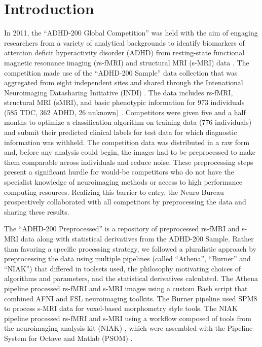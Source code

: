 \documentclass[preprint,12pt,3p]{elsarticle}
\begin{document}
\section{Introduction}

In 2011, the ``ADHD-200 Global Competition'' was held with the aim of engaging researchers from a variety of analytical backgrounds to identify biomarkers of attention deficit hyperactivity disorder (ADHD) from resting-state functional magnetic resonance imaging (rs-fMRI) and structural MRI (s-MRI) data \cite{Milham2012}. The competition made use of the ``ADHD-200 Sample'' data collection that was aggregated from eight independent sites and shared through the Intenational Neuroimaging Datasharing Initiative (INDI) \cite{Mennes2013}. The data includes rs-fMRI, structural MRI (sMRI), and basic phenotypic information for 973 individuals (585 TDC, 362 ADHD, 26 unknown) \cite{Milham2012}. Competitors were given five and a half months to optimize a classification algorithm on training data (776 individuals) and submit their predicted clinical labels for test data for which diagnostic information was withheld. The competition data was distributed in a raw form and, before any analysis could begin, the images had to be preprocessed to make them comparable across individuals and reduce noise. These preprocessing steps present a significant hurdle for would-be competitors who do not have the specialist knowledge of neuroimaging methods or access to high performance computing resources. Realizing this barrier to entry, the Neuro Bureau prospectively collaborated with all competitors by preprocessing the data and sharing these results.

The ``ADHD-200 Preprocessed'' is a repository of preprocessed rs-fMRI and s-MRI data along with statistical derivatives from the ADHD-200 Sample. Rather than favoring a specific processing strategy, we followed a pluralistic approach by preprocessing the data using multiple pipelines (called ``Athena'', ``Burner'' and ``NIAK'') that differed in toolsets used, the philosophy motivating choices of algorithms and parameters, and the statistical derivatives calculated. The Athena pipeline processed rs-fMRI and s-MRI images using a custom Bash script that combined AFNI \cite{cox1996afni} and FSL \cite{smith2004advances} neuroimaging toolkits. The Burner pipeline used SPM8 \cite{ashburner2012spm8} to process s-MRI data for voxel-based morphometry style tools. The NIAK pipeline processed rs-fMRI and s-MRI using a workflow composed of tools from the neuroimaging analysis kit (NIAK) \cite{Bellec2011}, which were assembled with the Pipeline System for Octave and Matlab (PSOM) \cite{Bellec2012}. 
\end{document}
